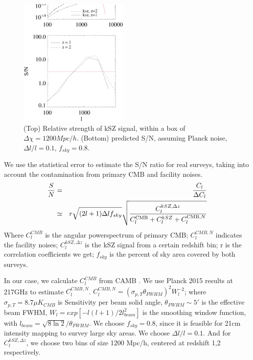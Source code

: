 \begin{figure}[tbp]
\begin{center}
\includegraphics[width=0.48\textwidth]{Cl_sn_z1z2.eps}
\end{center}
\vspace{-0.7cm}
\caption{(Top) Relative strength of kSZ signal, within a box of $\Delta \chi=1200 Mpc/h$. 
    (Bottom) predicted S/N, assuming Planck noise, $\Delta l/l=0.1$, $f_{sky}=0.8$. 
}
\label{fig:sn}
\end{figure}
We use the statistical error to estimate the S/N ratio for real surveys, 
taking into account the contamination from primary CMB and facility noises.
\begin{eqnarray}
    \frac{S}{N}&=&\frac{C_l}{\Delta C_l}\\\nonumber
               &\simeq&
r\sqrt{(2l+1)\Delta l f_{sky}}\sqrt{\frac{C_l^{kSZ,\Delta z}}{C_l^{\mathrm{CMB}}+C_l^{kSZ}+C_l^{\mathrm{CMB},N}}}
\end{eqnarray}
Where $C_l^{CMB}$ is the angular powerspectrum of primary CMB; 
$C_l^{CMB,N}$ indicates the facility noises; 
$C_l^{kSZ,\Delta z}$ is the kSZ signal from a certain redshift bin; 
r is the correlation coefficients we get; 
$f_{sky}$ is the percent of sky area covered by both surveys.

In our case, we calculate $C_l^{CMB}$ from CAMB \cite{CAMB}. 
We use Planck 2015 results \cite{Planck2015} at 217GHz to estimate $C_l^{CMB,N}$.
$C_l^{CMB,N}=(\sigma_{p,T}\theta_{FWHM})^2W_l^{-2}$;  
where $\sigma_{p,T}=8.7\mu K_{CMB}$ is Sensitivity per beam solid angle, 
$\theta_{FWHM}\sim 5'$ is the effective beam FWHM, 
$W_l=exp[-l(l+1)/2l^2_{beam}]$ is the smoothing window function, 
with $l_{beam}=\sqrt{8\ln2}/\theta_{FWHM}$. 
We choose $f_{sky}=0.8$, since it is feasible for 21cm intensity mapping to survey large sky areas. 
We choose $\Delta l/l=0.1$. 
And for $C_l^{kSZ,\Delta z}$, we choose two bins of size 1200 Mpc/h, centered at redshift 1,2 respectively.

